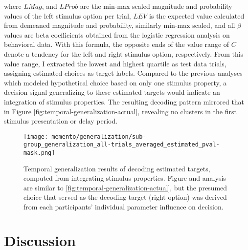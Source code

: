 where $LMag$, and $LProb$ are the min-max scaled magnitude and probability values of the left stimulus option per trial, $LEV$ is the expected value calculated from demeaned magnitude and probability, similarly min-max scaled, and all $\beta$ values are beta coefficients obtained from the logistic regression analysis on behavioral data.
With this formula, the opposite ends of the value range of $C$ denote a tendency for the left and right stimulus option, respectively.
From this value range, I extracted the lowest and highest quartile as test data trials, assigning estimated choices as target labels.
Compared to the previous analyses which modeled hypothetical choice based on only one stimulus property, a decision signal generalizing to these estimated targets would indicate an integration of stimulus properties.
The resulting decoding pattern mirrored that in Figure \ref{fig:temporal-generalization-actual}, revealing no clusters in the first stimulus presentation or delay period.



\begin{figure}[H]
	\centering
	\texttt{[image: memento/generalization/sub-group\_generalization\_all-trials\_averaged\_estimated\_pval-mask.png]}
	\caption[Temporal generalization: Estimated choice]{Temporal generalization results of decoding estimated targets, computed from integrating stimulus properties. Figure and analysis are similar to \ref{fig:temporal-generalization-actual}, but the presumed choice that served as the decoding target (right option) was derived from each participants' individual parameter influence on decision.}
	\label{fig:temporal-generalization-estimated}
\end{figure}

\section{Discussion}

